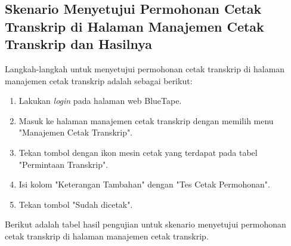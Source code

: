 \subsection{Skenario Menyetujui Permohonan Cetak Transkrip di Halaman Manajemen Cetak Transkrip dan Hasilnya}
\label{subsec:skenario_menyetujui_permohonan_cetak_transkrip_di_halaman_manajemen_cetak_transkrip}
Langkah-langkah untuk menyetujui permohonan cetak transkrip di halaman manajemen cetak transkrip adalah sebagai berikut:

\begin{enumerate}
    \item Lakukan \textit{login} pada halaman web BlueTape.
    \item Masuk ke halaman manajemen cetak transkrip dengan memilih menu "Manajemen Cetak Transkrip".
    \item Tekan tombol dengan ikon mesin cetak yang terdapat pada tabel "Permintaan Transkrip".
    \item Isi kolom "Keterangan Tambahan" dengan "Tes Cetak Permohonan".
    \item Tekan tombol "Sudah dicetak".
\end{enumerate}

Berikut adalah tabel hasil pengujian untuk skenario menyetujui permohonan cetak transkrip di halaman manajemen cetak transkrip.

